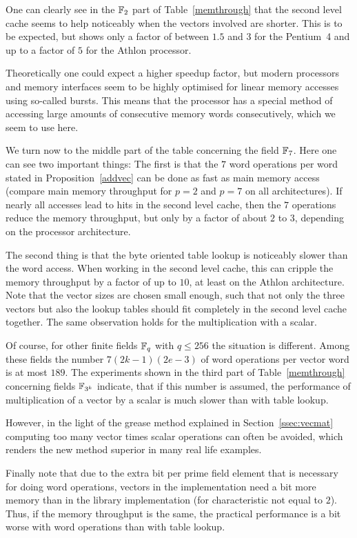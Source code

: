 One can clearly see in the $\mathbb{F}_2$ part of
Table~\ref{memthrough} that the second level cache seems to help noticeably
when the vectors involved are shorter. This is to be expected, but shows
only a factor of between $1.5$ and $3$ for the Pentium~4 and up to 
a factor of $5$ for the Athlon processor.

Theoretically one could expect a higher speedup factor, but modern
processors and memory interfaces seem to be highly optimised for 
linear memory accesses using so-called bursts. This means that the
processor has a special method of accessing large amounts of consecutive
memory words consecutively, which we seem to use here.

We turn now to the middle part of the table concerning the field $\mathbb{F}_7$.
Here one can see two important things: The first is that the $7$ word
operations per word stated in Proposition~\ref{addvec} can be done as
fast as main memory access (compare main memory throughput for $p=2$ and
$p=7$ on all architectures). If nearly all accesses lead to hits in 
the second level cache, then the $7$ operations reduce the memory
throughput, but only by a factor of about $2$ to $3$, depending on
the processor architecture.

The second thing is that the byte oriented table lookup is noticeably
slower than the word access. When working in the second level cache,
this can cripple the memory throughput by a factor of up to $10$, at least on
the Athlon architecture. Note that the vector sizes are chosen small
enough, such that not only the three vectors but also the lookup tables
should fit completely in the second level cache together.
The same observation holds for the multiplication with a scalar. 

Of course, for other finite fields $\mathbb{F}_q$ with $q \le 256$ the situation
is different. Among these fields the number $7(2k-1)(2e-3)$ of word
operations per vector word is at most $189$. The experiments shown in
the third part of Table~\ref{memthrough} concerning fields $\mathbb{F}_{3^k}$ 
indicate, that
if this number is assumed, the performance of multiplication of a vector
by a scalar is much slower than with table lookup. 

However, in the light of the grease method explained in
Section~\ref{ssec:vecmat} computing too many vector times scalar 
operations can often be avoided, which renders the new method
superior in many real life examples.

Finally note that due to the extra bit per prime field element that
is necessary for doing word operations, vectors in the {\cvec}
implementation need a bit more memory than in the {\GAP} library
implementation (for characteristic not equal to $2$).
Thus, if the memory throughput is the same, the practical performance is 
a bit worse with word operations than with table lookup.

